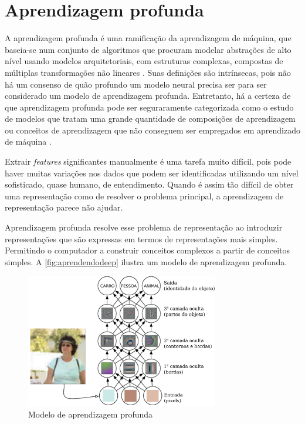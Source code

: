 \section{Aprendizagem profunda}

A aprendizagem profunda é uma ramificação da aprendizagem de máquina, que baseia-se num conjunto de algoritmos que procuram modelar abstrações de alto nível usando modelos arquitetoriais, com estruturas complexas, compostas de múltiplas transformações não lineares \cite{deng2014deep}. Suas definições são intrínsecas, pois não há um consenso de quão profundo um modelo neural precisa ser para ser considerado um modelo de aprendizagem profunda. Entretanto, há a certeza de que aprendizagem profunda pode ser seguraramente categorizada como o estudo de modelos que tratam uma grande quantidade de composições de aprendizagem ou conceitos de aprendizagem que não conseguem ser empregados em aprendizado de máquina \cite{Bengio-et-al-2015-Book}. 




Extrair \textit{features} significantes manualmente é uma tarefa muito difícil, pois pode haver muitas variações nos dados que podem ser identificadas utilizando um nível sofisticado, quase humano, de entendimento. Quando é assim tão difícil de obter uma representação como de resolver o problema principal, a aprendizagem de representação parece não ajudar. 

Aprendizagem profunda resolve esse problema de representação ao introduzir representações que são expressas em termos de representações mais simples. Permitindo o computador a construir conceitos complexos a partir de conceitos simples. A \autoref{fig:aprendendodeep} ilustra um modelo de aprendizagem profunda.

\begin{figure}
\centering
\caption{Modelo de aprendizagem profunda} \label{fig:aprendendodeep}
\includegraphics[width=0.75\textwidth]{img/aprendendodeep.pdf}
\end{figure}

